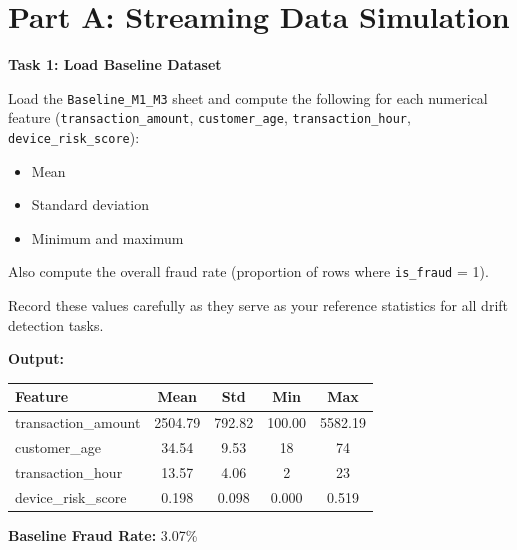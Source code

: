 \documentclass[12pt,a4paper]{article}
\begin{document}

\section*{Part A: Streaming Data Simulation}

\begin{tcolorbox}
\textbf{Task 1: Load Baseline Dataset}

Load the \texttt{Baseline\_M1\_M3} sheet and compute the following for each numerical feature (\texttt{transaction\_amount}, \texttt{customer\_age}, \texttt{transaction\_hour}, \texttt{device\_risk\_score}):
\begin{itemize}
\item Mean
\item Standard deviation
\item Minimum and maximum
\end{itemize}

Also compute the overall fraud rate (proportion of rows where \texttt{is\_fraud} = 1).

Record these values carefully as they serve as your reference statistics for all drift detection tasks.
\end{tcolorbox}

\vspace{6pt}

\textbf{Output:}

\begin{center}
\renewcommand{\arraystretch}{1.4}
\begin{tabular}{lcccc}
\toprule
\textbf{Feature} & \textbf{Mean} & \textbf{Std} & \textbf{Min} & \textbf{Max} \\
\midrule
transaction\_amount & 2504.79 & 792.82 & 100.00 & 5582.19 \\
customer\_age & 34.54 & 9.53 & 18 & 74 \\
transaction\_hour & 13.57 & 4.06 & 2 & 23 \\
device\_risk\_score & 0.198 & 0.098 & 0.000 & 0.519 \\
\bottomrule
\end{tabular}
\renewcommand{\arraystretch}{1.0}
\end{center}

\vspace{4pt}
\textbf{Baseline Fraud Rate:} 3.07\%

\vspace{24pt}
\end{document}
